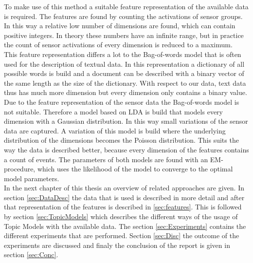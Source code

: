 \documentclass[11pt,a4paper]{article}
\begin{document}
To make use of this method a suitable feature representation of the available data is required. The features are found by counting the activations of sensor groups. In this way a relative low number of dimensions are found, which can contain positive integers. In theory these numbers have an infinite range, but in practice the count of sensor activations of every dimension is reduced to a maximum.\\
This feature representation differs a lot to the Bag-of-words model that is often used for the description of textual data. In this representation a dictionary of all possible words is build and a document can be described with a binary vector of the same length as the size of the dictionary. With respect to our data, text data thus has much more dimension but every dimension only contains a binary value.\\

Due to the feature representation of the sensor data the Bag-of-words model is not suitable. Therefore a model based on LDA is build that models every dimension with a Gaussian distribution. In this way small variations of the sensor data are captured. A variation of this model is build where the underlying distribution of the dimensions becomes the Poisson distribution. This suits the way the data is described better, because every dimension of the features contains a count of events. The parameters of both models are found with an EM-procedure, which uses the likelihood of the model to converge to the optimal model parameters.\\


In the next chapter of this thesis an overview of related approaches are given. In section \ref{sec:DataDesc} the data that is used is described in more detail and after that representation of the features is described in \ref{sec:features}. This is followed by section \ref{sec:TopicModels} which describes the different ways of the usage of Topic Models with the available data. The section \ref{sec:Experiments} contains the different experiments that are performed. Section \ref{sec:Disc} the outcome of the experiments are discussed and finaly the conclusion of the report is given in section \ref{sec:Conc}.
\end{document}
